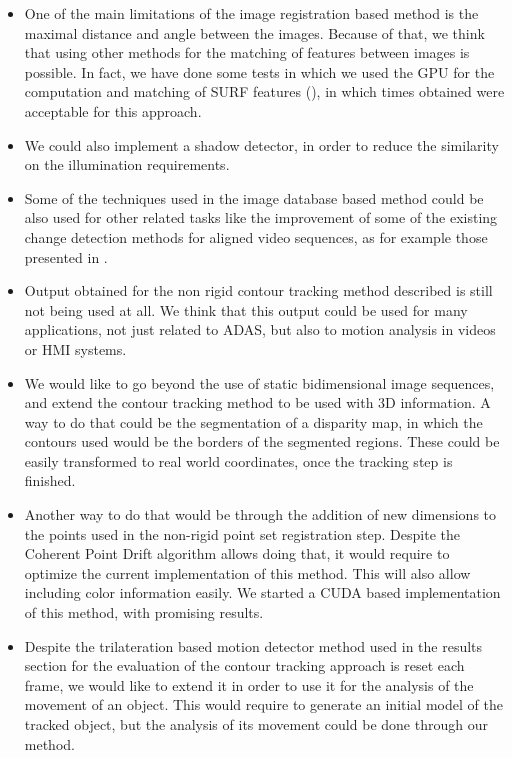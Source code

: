 \begin{itemize}
 \item One of the main limitations of the image registration based method is the maximal distance and angle between the images. Because of that, we think that using other methods for the matching of features between images is possible. In fact, we have done some tests in which we used the \ac{GPU} for the computation and matching of \ac{SURF} features (\cite{bay2008speeded}), in which times obtained were acceptable for this approach.
 \item We could also implement a shadow detector, in order to reduce the similarity on the illumination requirements.
 \item Some of the techniques used in the image database based method could be also used for other related tasks like the improvement of some of the existing change detection methods for aligned video sequences, as for example those presented in \cite{diego2011video, evangelidis2011slice, evangelidis2011efficient}.
 \item Output obtained for the non rigid contour tracking method described is still not being used at all. We think that this output could be used for many applications, not just related to \ac{ADAS}, but also to motion analysis in videos or \ac{HMI} systems.
 \item We would like to go beyond the use of static bidimensional image sequences, and extend the contour tracking method to be used with 3D information. A way to do that could be the segmentation of a disparity map, in which the contours used would be the borders of the segmented regions. These could be easily transformed to real world coordinates, once the tracking step is finished.
 \item Another way to do that would be through the addition of new dimensions to the points used in the non-rigid point set registration step. Despite the Coherent Point Drift algorithm allows doing that, it would require to optimize the current implementation of this method. This will also allow including color information easily. We started a \ac{CUDA} based implementation of this method, with promising results.
 \item Despite the trilateration based motion detector method used in the results section for the evaluation of the contour tracking approach is reset each frame, we would like to extend it in order to use it for the analysis of the movement of an object. This would require to generate an initial model of the tracked object, but the analysis of its movement could be done through our method.

\end{itemize}
